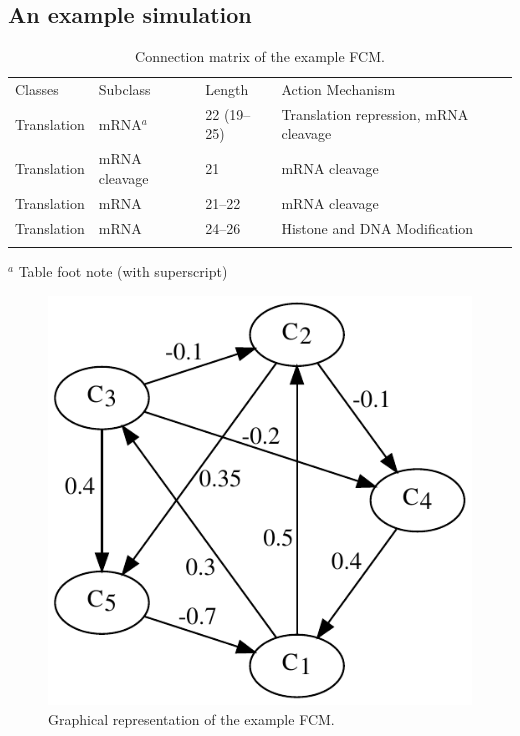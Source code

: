 \documentclass[graybox]{svmult}
\begin{document}
\subsection{An example simulation}

\begin{table}[!t]
\caption{Connection matrix of the example FCM.}
\label{tab:exampleConnMtx}
\begin{tabular}{p{2cm}p{2.4cm}p{2cm}p{4.9cm}}
\hline\noalign{\smallskip}
Classes & Subclass & Length & Action Mechanism  \\
\noalign{\smallskip}\svhline\noalign{\smallskip}
Translation & mRNA$^a$  & 22 (19--25) & Translation repression, mRNA cleavage\\
Translation & mRNA cleavage & 21 & mRNA cleavage\\
Translation & mRNA  & 21--22 & mRNA cleavage\\
Translation & mRNA  & 24--26 & Histone and DNA Modification\\
\noalign{\smallskip}\hline\noalign{\smallskip}
\end{tabular}
$^a$ Table foot note (with superscript)
\end{table}


\begin{figure}[hbt]
  \sidecaption
  \includegraphics[scale=0.5]{simulation/graph.pdf}
  \caption{Graphical representation of the example FCM.}
  \label{fig:exampleGraph}
\end{figure}
\end{document}
